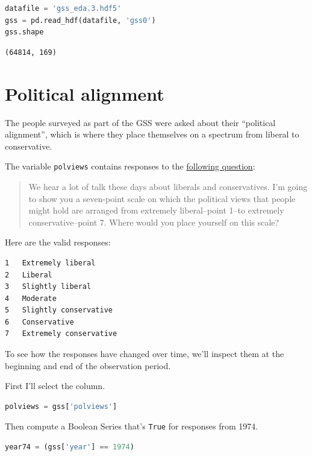 \begin{lstlisting}[language=Python]
datafile = 'gss_eda.3.hdf5'
gss = pd.read_hdf(datafile, 'gss0')
gss.shape
\end{lstlisting}

\begin{lstlisting}[]
(64814, 169)
\end{lstlisting}

\hypertarget{political-alignment}{%
\section{Political alignment}\label{political-alignment}}

The people surveyed as part of the GSS were asked about their
``political alignment'', which is where they place themselves on a
spectrum from liberal to conservative.

The variable \passthrough{\lstinline!polviews!} contains responses to
the
\href{https://gssdataexplorer.norc.org/projects/52787/variables/178/vshow}{following
question}:

\begin{quote}
We hear a lot of talk these days about liberals and conservatives. I'm
going to show you a seven-point scale on which the political views that
people might hold are arranged from extremely liberal--point 1--to
extremely conservative--point 7. Where would you place yourself on this
scale?
\end{quote}

Here are the valid responses:

\begin{lstlisting}[]
1   Extremely liberal
2   Liberal
3   Slightly liberal
4   Moderate
5   Slightly conservative
6   Conservative
7   Extremely conservative
\end{lstlisting}

To see how the responses have changed over time, we'll inspect them at
the beginning and end of the observation period.

First I'll select the column.

\begin{lstlisting}[language=Python]
polviews = gss['polviews']
\end{lstlisting}

Then compute a Boolean Series that's \passthrough{\lstinline!True!} for
responses from 1974.

\begin{lstlisting}[language=Python]
year74 = (gss['year'] == 1974)
\end{lstlisting}

